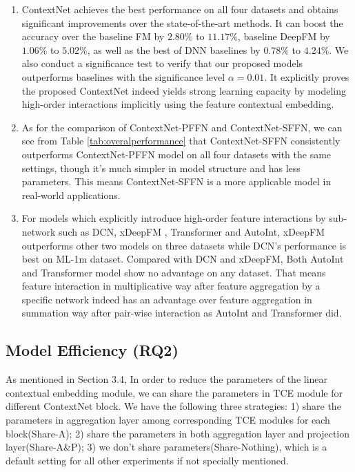 \documentclass[sigconf]{acmart}
\begin{document}
\begin{enumerate}
  \item ContextNet achieves the best performance on all four datasets and obtains significant improvements over the state-of-the-art methods. It can boost the accuracy over the baseline FM by $2.80\%$ to $11.17\%$, baseline DeepFM by $1.06\%$ to $5.02\%$, as well as the best of DNN baselines by $0.78\%$ to $4.24\%$. We also conduct a significance test to verify that our proposed models outperforms baselines with the significance level $\alpha = 0.01$. It explicitly proves the proposed ContextNet  indeed yields strong learning capacity by modeling high-order interactions implicitly using the feature contextual embedding.

  \item 	As for the comparison of ContextNet-PFFN and ContextNet-SFFN, we can see from Table \ref{tab:overalperformance} that ContextNet-SFFN consistently outperforms ContextNet-PFFN model on all four datasets with the same settings, though it's much simpler in model structure and has less parameters. This means ContextNet-SFFN is a more applicable model in real-world applications.


  \item For models which explicitly introduce high-order feature interactions by sub-network such as DCN, xDeepFM , Transformer and AutoInt, xDeepFM outperforms other two models on three datasets while DCN's performance is best on ML-1m dataset. Compared with DCN and xDeepFM, Both AutoInt and Transformer model show no advantage on any dataset. That means feature interaction in multiplicative way after feature aggregation by a specific network indeed has an advantage over feature aggregation in summation way after pair-wise interaction as AutoInt and Transformer did.
\end{enumerate}


\subsection{Model Efficiency (RQ2)}
As mentioned in Section 3.4, In order to reduce the parameters of the linear contextual embedding module, we can share the parameters in TCE module for different ContextNet block. We have the following three strategies: 1) share the parameters in aggregation layer among corresponding TCE modules for each block(Share-A); 2) share the parameters in both aggregation layer and projection layer(Share-A\&P); 3) we don't share parameters(Share-Nothing), which is a default setting for all other experiments if not specially mentioned.
\end{document}
